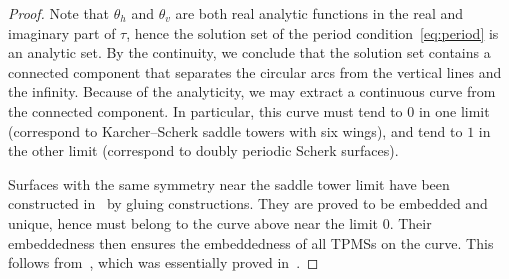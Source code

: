\documentclass[a4paper]{amsart}
\theoremstyle{plain}
\theoremstyle{definition}
\begin{document}
\begin{proof}
		Note that $\theta_h$ and $\theta_v$ are both real analytic functions in the
		real and imaginary part of $\tau$, hence the solution set of the period
		condition~\eqref{eq:period} is an analytic set.  By the continuity, we
		conclude that the solution set contains a connected component that separates
		the circular arcs from the vertical lines and the infinity.  Because of the
		analyticity, we may extract a continuous curve from the connected component.
		In particular, this curve must tend to $0$ in one limit (correspond to
		Karcher--Scherk saddle towers with six wings), and tend to $1$ in the other
		limit (correspond to doubly periodic Scherk surfaces).

		Surfaces with the same symmetry near the saddle tower limit have been
		constructed in~\cite{chen2024} by gluing constructions.  They are proved to
		be embedded and unique, hence must belong to the curve above near the limit
		0.  Their embeddedness then ensures the embeddedness of all TPMSs on the
		curve.  This follows from~\cite[Proposition~5.6]{weyhaupt2006}, which was
		essentially proved in~\cite{meeks1990}.
	\end{proof}

	
\end{document}
